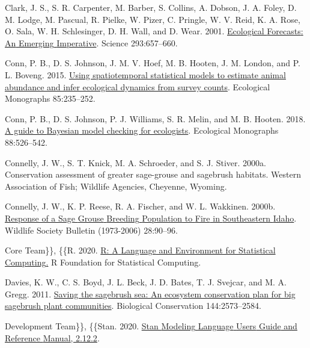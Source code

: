 \documentclass[
  12pt,
]{article}
\newlength{\cslhangindent}
\newlength{\cslentryspacingunit} %
\newenvironment{CSLReferences}[2] %
 {%
  \setlength{\parindent}{0pt}
  \ifodd #1
  \let\oldpar\par
  \def\par{\hangindent=\cslhangindent\oldpar}
  \fi
  \setlength{\parskip}{#2\cslentryspacingunit}
 }%
 {}
\begin{document}
\begin{CSLReferences}{1}{0}
\leavevmode{}%
Clark, J. S., S. R. Carpenter, M. Barber, S. Collins, A. Dobson, J. A. Foley, D. M. Lodge, M. Pascual, R. Pielke, W. Pizer, C. Pringle, W. V. Reid, K. A. Rose, O. Sala, W. H. Schlesinger, D. H. Wall, and D. Wear. 2001. \href{https://doi.org/10.1126/science.293.5530.657}{Ecological {Forecasts}: {An} {Emerging} {Imperative}}. Science 293:657--660.

\leavevmode{}%
Conn, P. B., D. S. Johnson, J. M. V. Hoef, M. B. Hooten, J. M. London, and P. L. Boveng. 2015. \href{https://doi.org/10.1890/14-0959.1}{Using spatiotemporal statistical models to estimate animal abundance and infer ecological dynamics from survey counts}. Ecological Monographs 85:235--252.

\leavevmode{}%
Conn, P. B., D. S. Johnson, P. J. Williams, S. R. Melin, and M. B. Hooten. 2018. \href{https://doi.org/10.1002/ecm.1314}{A guide to {Bayesian} model checking for ecologists}. Ecological Monographs 88:526--542.

\leavevmode{}%
Connelly, J. W., S. T. Knick, M. A. Schroeder, and S. J. Stiver. 2000a. Conservation assessment of greater sage-grouse and sagebrush habitats. Western Association of Fish; Wildlife Agencies, Cheyenne, Wyoming.

\leavevmode{}%
Connelly, J. W., K. P. Reese, R. A. Fischer, and W. L. Wakkinen. 2000b. \href{https://www.jstor.org/stable/4617288}{Response of a {Sage} {Grouse} {Breeding} {Population} to {Fire} in {Southeastern} {Idaho}}. Wildlife Society Bulletin (1973-2006) 28:90--96.

\leavevmode{}%
Core Team\}\}, \{\{R. 2020. \href{https://www.R-project.org/}{R: {A} {Language} and {Environment} for {Statistical} {Computing}.} R Foundation for Statistical Computing.

\leavevmode{}%
Davies, K. W., C. S. Boyd, J. L. Beck, J. D. Bates, T. J. Svejcar, and M. A. Gregg. 2011. \href{https://doi.org/10.1016/j.biocon.2011.07.016}{Saving the sagebrush sea: {An} ecosystem conservation plan for big sagebrush plant communities}. Biological Conservation 144:2573--2584.

\leavevmode{}%
Development Team\}\}, \{\{Stan. 2020. \href{https://mc-stan.org}{Stan {Modeling} {Language} {Users} {Guide} and {Reference} {Manual}, 2.12.2}.


\end{CSLReferences}
\end{document}
